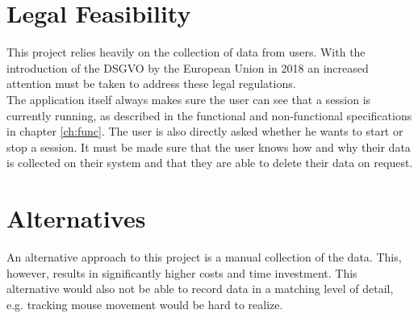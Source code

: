 \section{Legal Feasibility}
\label{Legal Feasibility}
This project relies heavily on the collection of data from \glspl{user}. With the introduction of the DSGVO by the European Union in 2018 an increased attention must be taken to address these legal regulations.\\
The application itself always makes sure the \gls{user} can see that a \gls{session} is currently running, as described in the functional and non-functional specifications in chapter \ref{ch:func}. The \gls{user} is also directly asked whether he wants to start or stop a \gls{session}.
It must be made sure that the \gls{user} knows how and why their data is collected on their system and that they are able to delete their data on request.

\section{Alternatives}
\label{Alternatives}
An alternative approach to this project is a manual collection of the data. This, however, results in significantly higher costs and time investment. This alternative would also not be able to record data in a matching level of detail, e.g. tracking mouse movement would be hard to realize.

